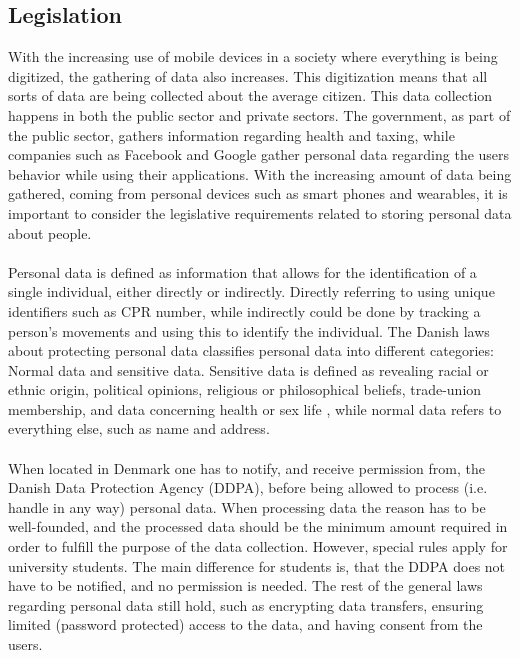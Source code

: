 
\subsection{Legislation}
\label{sub:legislation}

With the increasing use of mobile devices in a society where everything is being digitized, the gathering of data also increases. This digitization means that all sorts of data are being collected about the average citizen. This data collection happens in both the public sector and private sectors. The government, as part of the public sector, gathers information regarding health and taxing, while companies such as Facebook and Google gather personal data regarding the users behavior while using their applications. With the increasing amount of data being gathered, coming from personal devices such as smart phones and wearables, it is important to consider the legislative requirements related to storing personal data about people.
\\\\
Personal data is defined as information that allows for the identification of a single individual, either directly or indirectly. Directly referring to using unique identifiers such as CPR number, while indirectly could be done by tracking a person's movements and using this to identify the individual. The Danish laws about protecting personal data classifies personal data into different categories: Normal data and sensitive data. Sensitive data is defined as revealing racial or ethnic origin, political opinions, religious or philosophical beliefs, trade-union membership, and data concerning health or sex life \parencite{datatilsynet_stud1}, while normal data refers to everything else, such as name and address.  
\\\\
When located in Denmark one has to notify, and receive permission from, the Danish Data Protection Agency (DDPA), before being allowed to process (i.e. handle in any way) personal data. When processing data the reason has to be well-founded, and the processed data should be the minimum amount required in order to fulfill the purpose of the data collection. However, special rules apply for university students. The main difference for students is, that the DDPA does not have to be notified, and no permission is needed. The rest of the general laws regarding personal data still hold, such as encrypting data transfers, ensuring limited (password protected) access to the data, and having consent from the users. 
